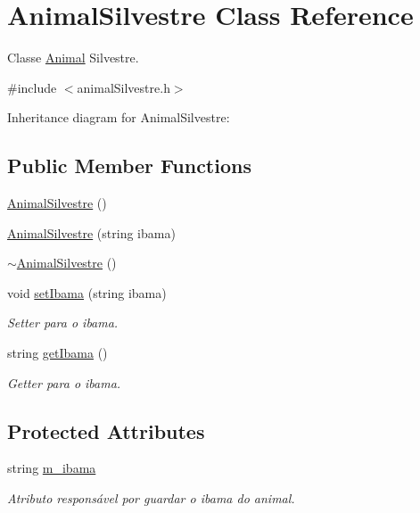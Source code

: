 \hypertarget{classAnimalSilvestre}{}\section{Animal\+Silvestre Class Reference}
\label{classAnimalSilvestre}


Classe \hyperlink{classAnimal}{Animal} Silvestre.  




{\ttfamily \#include $<$animal\+Silvestre.\+h$>$}



Inheritance diagram for Animal\+Silvestre\+:
\subsection*{Public Member Functions}
\begin{DoxyCompactItemize}
\item 
\hyperlink{classAnimalSilvestre_ab399a508e477d58526bdde4c49365488}{Animal\+Silvestre} ()
\item 
\hyperlink{classAnimalSilvestre_a2ebc8c1547503f32bd0fb61c43d4c943}{Animal\+Silvestre} (string ibama)
\item 
\hyperlink{classAnimalSilvestre_a3c7b842e393cda436f252c4eb6021aaa}{$\sim$\+Animal\+Silvestre} ()
\item 
void \hyperlink{classAnimalSilvestre_a119ffbf619c8e617c748e5b1b7db1e6f}{set\+Ibama} (string ibama)
\begin{DoxyCompactList}\small\item\em Setter para o ibama. \end{DoxyCompactList}\item 
string \hyperlink{classAnimalSilvestre_a4b70fdc24d4ee6607cadaf83c02c76da}{get\+Ibama} ()
\begin{DoxyCompactList}\small\item\em Getter para o ibama. \end{DoxyCompactList}\end{DoxyCompactItemize}
\subsection*{Protected Attributes}
\begin{DoxyCompactItemize}
\item 
string \hyperlink{classAnimalSilvestre_a4c92c625318b23e550b8bb24fb934d14}{m\+\_\+ibama}
\begin{DoxyCompactList}\small\item\em Atributo responsável por guardar o ibama do animal. \end{DoxyCompactList}\end{DoxyCompactItemize}


